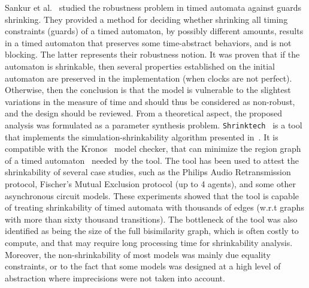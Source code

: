 Sankur et al.~\cite{ocan} studied the robustness problem in timed automata against guards
shrinking. They provided a method for deciding whether shrinking all timing constraints (guards)
of a timed automaton, by possibly different amounts, results in a timed automaton that 
preserves some time-abstract behaviors, and is not blocking. The latter represents their
robustness notion.
It was proven that if the automaton is shrinkable, then several properties established on the 
initial automaton are preserved in the implementation (when clocks are not perfect). 
Otherwise, then the conclusion is that the model is vulnerable to the slightest variations in the 
measure of time and should thus be considered as non-robust, and the design should be reviewed.
From a theoretical aspect, the proposed analysis was formulated as a parameter synthesis
problem. \texttt{Shrinktech}~\cite{ocan2} is a tool that implements the simulation-shrinkability 
algorithm presented in~\cite{ocan}. It is compatible with the Kronos~\cite{kronos} model checker,
that can minimize the region graph of a timed automaton~\cite{tl} needed by the tool.
The tool has been used to attest the shrinkability of several case studies, such as 
the Philips Audio Retransmission protocol, Fischer's Mutual
Exclusion protocol (up to 4 agents), and some other asynchronous circuit models.
These experiments showed that the tool is capable of treating shrinkability of timed automata 
with thousands of edges (w.r.t graphs with more than sixty thousand transitions).
The bottleneck of the tool was also identified as being the size of the full bisimilarity graph,
which is often costly to compute, and that may require long processing time for shrinkability analysis. 
Moreover, the non-shrinkability of most models was mainly due equality constraints, or to the fact
that some models was designed at a high level of abstraction where imprecisions were
not taken into account.




